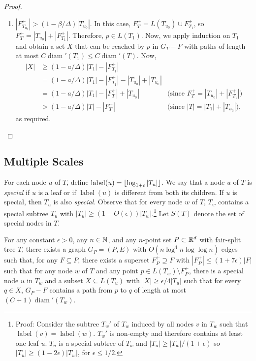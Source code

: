 \documentclass{patmorin}
\DeclareMathOperator{\diam}{diam}
\DeclareMathOperator{\lbl}{label}
\begin{document}
\begin{proof}
\begin{enumerate}
    \item $|F^+_{T_{u_0}}|> (1-\beta/\Delta)|T_{u_0}|$.  In this case,
      $F^+_T= L(T_{u_0})\cup F^+_{T_1}$, so $F^+_T= |T_{u_0}| + |F^+_{T_1}|$.  Therefore, $p\in L(T_1)$.
      Now, we apply induction on $T_1$ and obtain a set $X$ that can be
      reached by $p$ in $G_T-F$ with paths of length at most $C\diam'(T_1)\le
      C\diam'(T)$. 
      Now,
     \begin{align*}
       |X| & \ge (1-a/\Delta)|T_1| - |F^+_{T_1}| \\
           & =   (1-a/\Delta)|T_1| - |F^+_{T_1}| 
                    - |T_{u_0}| + |T_{u_0}| \\
           & =   (1-a/\Delta)|T_1| - |F^+_{T}| + |T_{u_0}| 
             & \text{(since $F^+_T= |T_{u_0}| + |F^+_{T_1}|$)} \\
           & >   (1-a/\Delta)|T| - |F^+_{T}| 
             & \text{(since $|T|=|T_1|+|T_{u_0}|$),} 
     \end{align*}
     as required. \qedhere
    \end{enumerate}
\end{proof}

\subsection{Multiple Scales}

For each node $u$ of $T$, define
$\lbl(u)=\floor{\log_{1+\epsilon}|T_u|}$. We say that a node $u$ of $T$
is \emph{special} if $u$ is a leaf or if $\lbl(u)$ is different from both
its children.  If $u$ is special, then $T_u$ is also \emph{special}.
Observe that for every node $w$ of $T$, $T_w$ contains a special
subtree $T_u$ with $|T_u|\ge (1-O(\epsilon))|T_w|$.\footnote{Proof:
Consider the subtree $T_w'$ of $T_w$ induced by all nodes $v$ in $T_w$
such that $\lbl(v)=\lbl(w)$. $T_w'$ is non-empty and therefore contains
at least one leaf $u$. $T_u$ is a special subtree of $T_w$ and $|T_u|\ge
|T_w|/(1+\epsilon)$ so $|T_u|\ge (1-2\epsilon)|T_w|$, for $\epsilon \le
1/2$.}  Let $S(T)$ denote the set of special nodes in $T$.

\begin{lem}
  For any constant $\epsilon >0$, any $n\in\mathbb{N}$, and any $n$-point
  set $P\subset\mathbb{R}^d$ with fair-split tree $T$, there exists a graph
  $G_P=(P,E)$ with $O(n\log^4 n\log\log n)$ edges such that, for any 
  $F\subseteq
  P$, there exists a superset $F^+_P\supseteq F$ with $|F^+_P|\le
  (1+7\epsilon)|F|$ such that for any node $w$ of $T$ and any point
  $p\in L(T_w)\setminus F^+_P$, there is a special node $u$ in $T_w$
  and a subset $X\subseteq L(T_u)$
  with $|X|\ge \epsilon/4|T_u|$ such that for every $q\in X$, $G_P-F$
  contains a path from $p$ to $q$ of length at most $(C+1)\diam'(T_w)$.
\end{lem}
\end{document}
